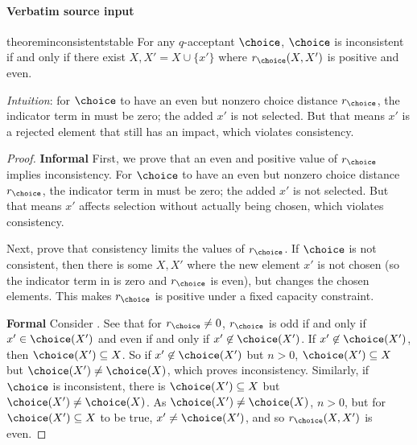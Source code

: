 \documentclass[10pt]{article}
\begin{document}
\paragraph{Verbatim source input}
\begin{ReviewVerbatim}
\begin{restatable}{theorem}{inconsistentstable}
\label{thm:even-inconsistency}
For any $q$-acceptant $\choice$, $\choice$ is inconsistent if and only if there exist $X, X' = X \cup \{x'\}$ where $r_\choice(X, X')$ is positive and even.
\end{restatable}

\textit{Intuition}: for $\choice$ to have an even but nonzero choice distance $r_\choice$, the indicator term in   must be zero; the added $x'$ is not selected. But that means $x'$ is a rejected element that still has an impact, which violates consistency.
\begin{proof}
\textbf{Informal}
First, we prove that an even and positive value of $r_\choice$ implies inconsistency. For $\choice$ to have an even but nonzero choice distance $r_\choice$, the indicator term in   must be zero; the added $x'$ is not selected. But that means $x'$ affects selection without actually being chosen, which violates consistency.

Next, prove that consistency limits the values of $r_\choice$. If $\choice$ is not consistent, then there is some $X, X'$ where the new element $x'$ is not chosen (so the indicator term in  is zero and $r_\choice$ is even), but changes the chosen elements. This makes  $r_\choice$ is positive under a fixed capacity constraint.

\textbf{Formal}
Consider . See that for $r_\choice \neq 0$, $r_\choice$ is odd if and only if $x' \in \choice(X')$ and even if and only if $x' \not\in \choice(X')$. If $x' \not\in \choice(X')$, then $\choice(X') \subseteq X$. %
So if $x' \not\in \choice(X')$ but $n > 0$, $\choice(X') \subseteq X$ but $\choice(X') \neq \choice(X)$, which proves inconsistency.
Similarly, if $\choice$ is inconsistent, there is $\choice(X') \subseteq X$ but $\choice(X') \neq \choice(X)$. %
As $\choice(X') \neq \choice(X)$, $n > 0$, but for $\choice(X') \subseteq X$ to be true, $x' \neq \choice(X')$, and so $r_\choice(X, X')$ is even.
\end{proof}
\end{ReviewVerbatim}
\end{document}
